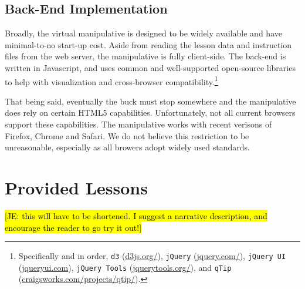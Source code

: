 \documentclass[11pt,letterpaper]{article}
\newcommand{\Note}[1]{}
\renewcommand{\Note}[1]{\hl{[#1]}}
\newcommand{\NoteSigned}[3]{{\sethlcolor{#2}\Note{#1: #3}}}
\newcommand{\NoteJE}[1]{\NoteSigned{JE}{LightGreen}{#1}}
\begin{document}

\subsection{Back-End Implementation}
Broadly, the virtual manipulative is designed to be widely available and have minimal-to-no start-up cost. 
Aside from reading the lesson data and instruction files from the web server, the manipulative is fully 
client-side. The back-end is written in Javascript, and uses common and well-supported open-source 
libraries to help with visualization and cross-browser compatibility.\footnote{Specifically and in order, 
\texttt{d3} (\url{d3js.org/}),
\texttt{jQuery} (\url{jquery.com/}), 
\texttt{jQuery UI} (\url{jqueryui.com}),
\texttt{jQuery Tools} (\url{jquerytools.org/}), and
\texttt{qTip} (\url{craigsworks.com/projects/qtip/}).}

That being said, eventually the buck must stop somewhere and the manipulative does rely on certain HTML5 
capabilities. Unfortunately, not all current browsers support these capabilities. The manipulative works 
with recent verisons of Firefox, Chrome and Safari. We do not believe this restriction to be unreasonable, 
especially as all browers adopt widely used standards.

%
%
%

\section{Provided Lessons}\label{sec:lessons}

\NoteJE{this will have to be shortened.  I suggest a narrative
  description, and encourage the reader to go try it out!}

\end{document}
